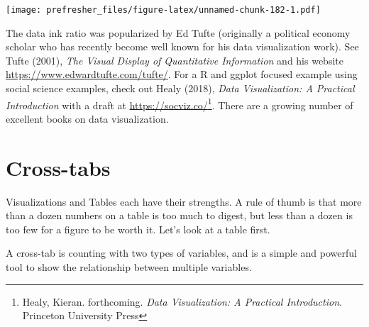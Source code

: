 \documentclass[]{book}
\newenvironment{Shaded}{\begin{snugshade}}{\end{snugshade}}
\newcommand{\DataTypeTok}[1]{\textcolor[rgb]{0.13,0.29,0.53}{#1}}
\newcommand{\KeywordTok}[1]{\textcolor[rgb]{0.13,0.29,0.53}{\textbf{#1}}}
\newcommand{\NormalTok}[1]{#1}
\newcommand{\OperatorTok}[1]{\textcolor[rgb]{0.81,0.36,0.00}{\textbf{#1}}}
\newcommand{\StringTok}[1]{\textcolor[rgb]{0.31,0.60,0.02}{#1}}
\let\rmarkdownfootnote\footnote%
\def\footnote{\protect\rmarkdownfootnote}
\theoremstyle{definition}
\theoremstyle{definition}
\theoremstyle{definition}
\theoremstyle{remark}
\begin{document}
\begin{Shaded}
\end{Shaded}

\texttt{[image: prefresher\_files/figure-latex/unnamed-chunk-182-1.pdf]}

The data ink ratio was popularized by Ed Tufte (originally a political economy scholar who has recently become well known for his data visualization work). See Tufte (2001), \emph{The Visual Display of Quantitative Information} and his website \url{https://www.edwardtufte.com/tufte/}. For a R and ggplot focused example using social science examples, check out Healy (2018), \emph{Data Visualization: A Practical Introduction} with a draft at \url{https://socviz.co/}\footnote{Healy, Kieran. forthcoming. \emph{Data Visualization: A Practical Introduction}. Princeton University Press}. There are a growing number of excellent books on data visualization.

\hypertarget{cross-tabs}{%
\section{Cross-tabs}\label{cross-tabs}}

Visualizations and Tables each have their strengths. A rule of thumb is that more than a dozen numbers on a table is too much to digest, but less than a dozen is too few for a figure to be worth it. Let's look at a table first.

A cross-tab is counting with two types of variables, and is a simple and powerful tool to show the relationship between multiple variables.
\end{document}
